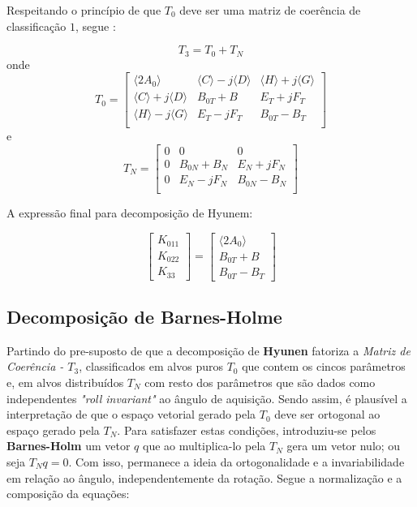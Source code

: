 \documentclass{article}
\begin{document}
Respeitando o princípio de que $T_{0}$ deve ser uma matriz de coerência de classificação $1$, segue \cite{jong:2009}:

\begin{equation}
    T_{3} = T_{0} + T_{N}
\end{equation}
onde 
\begin{equation}
    T_{0} = 
        \begin{bmatrix}
        \langle2A_{0}\rangle & \langle C \rangle-j\langle D \rangle & \langle H \rangle+j\langle G \rangle\\
        \langle C \rangle+j\langle D \rangle & B_{0T}+B &  E_{T}+j F_{T}\\
        \langle H \rangle-j\langle G \rangle & E_{T}-j F_{T} &  B_{0T} - B_{T}\\
    \end{bmatrix}
\end{equation}
e
\begin{equation}
    T_{N} = 
        \begin{bmatrix}
        0 & 0 & 0\\
        0 & B_{0N}+B_{N} &  E_{N}+j F_{N}\\
        0 & E_{N}-j F_{N} &  B_{0N} - B_{N}\\
    \end{bmatrix}
\end{equation}

A expressão final para decomposição de Hyunem:

\begin{equation}
    \begin{bmatrix}
        K_{011} \\
	    K_{022}\\
	    K_{33}
    \end{bmatrix} = 
    \begin{bmatrix}
        \langle2A_{0}\rangle \\
	    B_{0T}+B \\
	    B_{0T} - B_{T}
    \end{bmatrix}
\end{equation}


\subsection{\textbf{Decomposição de Barnes-Holme}}

Partindo do pre-suposto de que a decomposição de \textbf{Hyunen} fatoriza a \textit{Matriz de Coerência - $T_{3}$}, classificados em alvos puros \textit{$T_{0}$} que contem os cincos parâmetros e, em alvos distribuídos \textit{$T_{N}$} com resto dos parâmetros que são dados como independentes \textit{"roll invariant"} ao ângulo de aquisição. Sendo assim, é plausível a interpretação de que o espaço vetorial gerado pela \textit{$T_{0}$} deve ser ortogonal ao espaço gerado pela \textit{$T_{N}$}. Para satisfazer estas condições, introduziu-se pelos \textbf{Barnes-Holm} um vetor $q$ que ao multiplica-lo  pela $T_{N}$ gera um vetor nulo; ou seja $T_{N}q = 0$. Com isso, permanece a ideia da ortogonalidade e a invariabilidade em relação ao ângulo, independentemente da rotação. Segue a normalização e a composição da equações:
\end{document}
